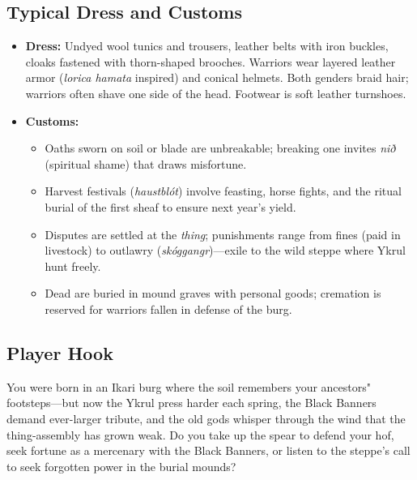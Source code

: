 \documentclass[12pt]{article}
\begin{document}
\subsection{Typical Dress and Customs}
\begin{itemize}[leftmargin=*]
  \item \textbf{Dress:} Undyed wool tunics and trousers, leather belts with iron buckles, cloaks fastened with thorn-shaped brooches. Warriors wear layered leather armor (\textit{lorica hamata} inspired) and conical helmets. Both genders braid hair; warriors often shave one side of the head. Footwear is soft leather turnshoes.
  \item \textbf{Customs:} 
  \begin{itemize}[leftmargin=*]
    \item Oaths sworn on soil or blade are unbreakable; breaking one invites \textit{nið} (spiritual shame) that draws misfortune.
    \item Harvest festivals (\textit{haustblót}) involve feasting, horse fights, and the ritual burial of the first sheaf to ensure next year's yield.
    \item Disputes are settled at the \textit{thing}; punishments range from fines (paid in livestock) to outlawry (\textit{skóggangr})---exile to the wild steppe where Ykrul hunt freely.
    \item Dead are buried in mound graves with personal goods; cremation is reserved for warriors fallen in defense of the burg.
  \end{itemize}
\end{itemize}

\subsection{Player Hook}
You were born in an Ikari burg where the soil remembers your ancestors" footsteps---but now the Ykrul press harder each spring, the Black Banners demand ever-larger tribute, and the old gods whisper through the wind that the thing-assembly has grown weak. Do you take up the spear to defend your hof, seek fortune as a mercenary with the Black Banners, or listen to the steppe's call to seek forgotten power in the burial mounds?
\end{document}
